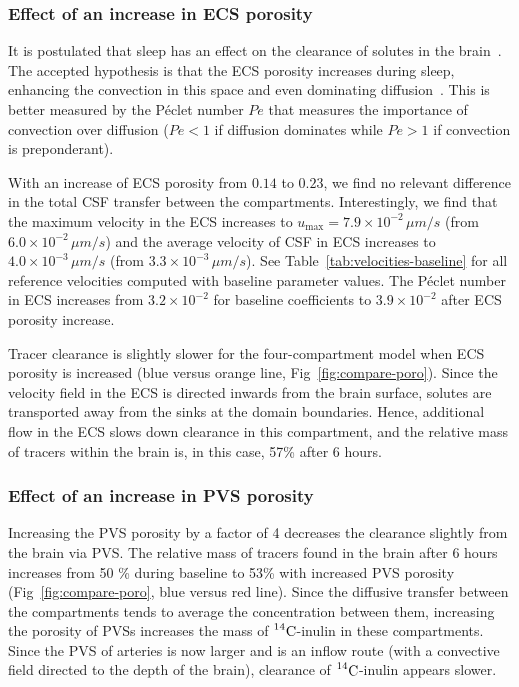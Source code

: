 \documentclass[a4paper,11pt]{article}
\newcommand{\1}{^{(1)}}
\newcommand{\2}{^{(2)}}
\newcommand{\Cinulin}{$\prescript{14}{}{\text{C}}$-inulin }
\begin{document}
\subsubsection{Effect of an increase in ECS porosity}
It is postulated that sleep has an effect on the clearance of solutes in the brain~\cite{Xie_2013_sleep}. The accepted hypothesis is that the ECS porosity increases during sleep, enhancing the convection in this space and even dominating diffusion~\cite{Xie_2013_sleep,thomas2022theoretical}. This is better measured by the P\'eclet number $Pe$ that measures the importance of convection over diffusion ($Pe<1$ if diffusion dominates while $Pe>1$ if convection is preponderant).

With an increase of ECS porosity from $0.14$ to $0.23$, we find no relevant difference in the total CSF transfer between the compartments. Interestingly, we find that the maximum velocity in the ECS increases to $u_\text{max} =7.9\times 10^{-2}\, \si{\mu m/s}$ (from $6.0 \times 10^{-2}\, \si{\mu m/s}$) and the average velocity of CSF in ECS increases to $4.0 \times 10^{-3}\, \si{\mu m/s}$ (from $3.3\times 10^{-3}\, \si{\mu m/s}$). See Table~\ref{tab:velocities-baseline} for all reference velocities computed with baseline parameter values. The P\'eclet number in ECS increases from $3.2 \times 10^{-2}$ for baseline coefficients to $3.9\times 10^{-2}$ after ECS porosity increase.

Tracer clearance is slightly slower for the four-compartment model when ECS porosity is increased (blue versus orange line, Fig~\ref{fig:compare-poro}). Since the velocity field in the ECS  is directed inwards from the brain surface, solutes are transported away from the sinks at the domain boundaries. Hence,
additional flow in the ECS slows down clearance in this compartment, and the relative mass of tracers within the brain is, in this case, 57\% after 6 hours. 

\subsubsection{Effect of an increase in PVS porosity}

Increasing the PVS porosity by a factor of 4 decreases the clearance slightly from the brain via PVS. The relative mass of tracers found in the brain after 6 hours increases from 50 \% during baseline to 53\% with increased PVS porosity (Fig~\ref{fig:compare-poro}, blue versus red line). Since the diffusive transfer between the compartments tends to average the concentration between them, increasing the porosity of PVSs increases the mass of \Cinulin in these compartments. Since the PVS of arteries is now larger and is an inflow route (with a convective field directed to the depth of the brain), clearance of \Cinulin appears slower. 
\end{document}
